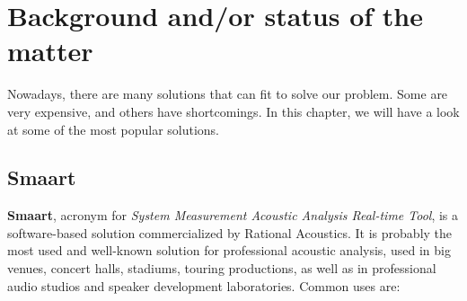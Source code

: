 \chapter{Background and/or status of the matter}

Nowadays, there are many solutions that can fit to solve our problem. Some are very expensive, and others have shortcomings. In this chapter, we will have a look at some of the most popular solutions.

\section{Smaart}

\textbf{Smaart}, acronym for \textit{System Measurement Acoustic Analysis Real-time Tool}, is a software-based solution commercialized by Rational Acoustics. It is probably the most used and well-known solution for professional acoustic analysis, used in big venues, concert halls, stadiums, touring productions, as well as in professional audio studios and speaker development laboratories.  Common uses are:

